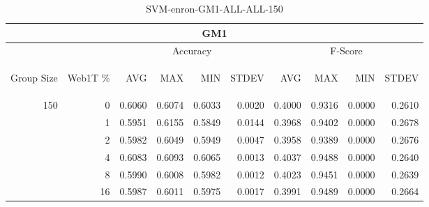 \begin{center}
\begin{table}[htbp] 
 \begin{center}
\begin{tabular}{ | r | r | r | r | r | r | r | r | r | r |}
\hline
\multicolumn{10}{|c|}{GM1}\\
\hline
 & & \multicolumn{4}{|c|}{Accuracy} & \multicolumn{4}{|c|}{F-Score}\\ \cline{3-10}
\begin{sideways}Group Size\end{sideways} & \begin{sideways}Web1T \%\end{sideways} & \begin{sideways}AVG\end{sideways} & \begin{sideways}MAX\end{sideways} & \begin{sideways}MIN\end{sideways} & \begin{sideways}STDEV\end{sideways} & \begin{sideways}AVG\end{sideways} & \begin{sideways}MAX\end{sideways} & \begin{sideways}MIN\end{sideways} & \begin{sideways}STDEV\end{sideways}\\
\hline
\multirow{5}{*}{150}
 & 0 & 0.6060 & 0.6074 & 0.6033 & 0.0020 & 0.4000 & 0.9316 & 0.0000 & 0.2610\\ \cline{2-10}
 & 1 & 0.5951 & 0.6155 & 0.5849 & 0.0144 & 0.3968 & 0.9402 & 0.0000 & 0.2678\\ \cline{2-10}
 & 2 & 0.5982 & 0.6049 & 0.5949 & 0.0047 & 0.3958 & 0.9389 & 0.0000 & 0.2676\\ \cline{2-10}
 & 4 & 0.6083 & 0.6093 & 0.6065 & 0.0013 & 0.4037 & 0.9488 & 0.0000 & 0.2640\\ \cline{2-10}
 & 8 & 0.5990 & 0.6008 & 0.5982 & 0.0012 & 0.4023 & 0.9451 & 0.0000 & 0.2639\\ \cline{2-10}
 & 16 & 0.5987 & 0.6011 & 0.5975 & 0.0017 & 0.3991 & 0.9489 & 0.0000 & 0.2664\\ \cline{2-10}
\hline
\end{tabular}
\caption{SVM-enron-GM1-ALL-ALL-150}
\label{table:SVM-enron-GM1-ALL-ALL-150}
\end{center}
 \end{table}
\end{center}

